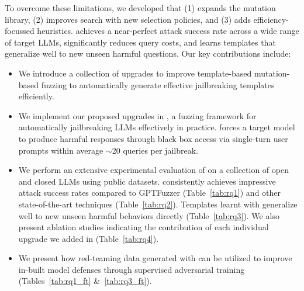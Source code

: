 To overcome these limitations, we developed \bedrockfuzz that (1) expands the mutation library, (2) improves search with new selection policies, and (3) adds efficiency-focussed heuristics.
\bedrockfuzz achieves a near-perfect attack success rate across a wide range of target LLMs, significantly reduces query costs, and learns templates that generalize well to new unseen harmful questions.
Our key contributions include:
\begin{itemize}
    \item We introduce a collection of upgrades to improve template-based mutation-based fuzzing to automatically generate effective jailbreaking templates efficiently.

    \item We implement our proposed upgrades in \bedrockfuzz, a fuzzing framework for automatically jailbreaking LLMs effectively in practice. \bedrockfuzz forces a target model to produce harmful responses through black box access via single-turn user prompts within average $\sim$20 queries per jailbreak.

    \item We perform an extensive experimental evaluation of \bedrockfuzz on a collection of open and closed LLMs using public datasets. \bedrockfuzz consistently achieves impressive attack success rates compared to GPTFuzzer (Table~\ref{tab:rq1}) and other state-of-the-art techniques (Table~\ref{tab:rq2}). Templates learnt with \bedrockfuzz generalize well to new unseen harmful behaviors directly (Table~\ref{tab:rq3}). We also present ablation studies indicating the contribution of each individual upgrade we added in \bedrockfuzz (Table~\ref{tab:rq4}). 

    \item We present how red-teaming data generated with \bedrockfuzz can be utilized to improve in-built model defenses through supervised adversarial training (Tables~\ref{tab:rq1_ft} \&~\ref{tab:rq3_ft}).
\end{itemize}



